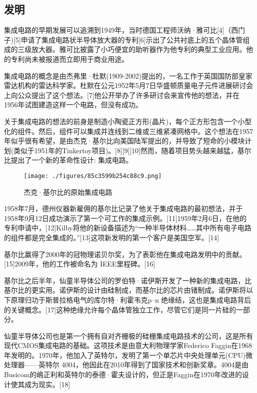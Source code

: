 \subsection{发明}

集成电路的早期发展可以追溯到1949年，当时德国工程师沃纳·雅可比[4]（西门子)[5]申请了集成电路状半导体放大器的专利[6]示出了公共衬底上的五个晶体管组成的三级放大器。雅可比披露了小巧便宜的助听器作为他专利的典型工业应用。他的专利尚未被报道而立即用于商业用途。

集成电路的概念是由杰弗里·杜默(1909-2002)提出的，一名工作于英国国防部皇家雷达机构的雷达科学家。杜默在公元1952年5月7日华盛顿质量电子元件进展研讨会上向公众提出了这个想法。[7]他公开举办了许多研讨会来宣传他的想法，并在1956年试图建造这样一个电路，但没有成功。

关于集成电路的想法的前身是制造小陶瓷正方形(晶片)，每个正方形包含一个小型化的组件。然后，组件可以集成并连线到二维或三维紧凑网格中。这个想法在1957年似乎很有希望，是由杰克·基尔比向美国陆军提出的，并导致了短命的小模块计划(类似于1951年的Tinkertoy项目)。[8][9][10]然而，随着项目势头越来越猛，基尔比提出了一个新的革命性设计: 集成电路。

\begin{figure}[ht]
\centering
\texttt{[image: ./figures/85c3599b254c88c9.png]}
\caption{杰克·基尔比的原始集成电路} \label{fig_icJCDL_2}
\end{figure}

1958年7月，德州仪器新雇佣的基尔比记录了他关于集成电路的最初想法，并于1958年9月12日成功演示了第一个可工作的集成示例。[11]1959年2月6日，在他的专利申请中，[12]Kilby将他的新设备描述为“一种半导体材料……其中所有电子电路的组件都是完全集成的。”[13]这项新发明的第一个客户是美国空军。[14]

基尔比赢得了2000年的冠物理诺贝尔奖，为了表彰他在集成电路发明中的贡献。[15]2009年，他的工作被命名为 IEEE里程碑。[16]

基尔比之后半年，仙童半导体公司的罗伯特·诺伊斯开发了一种新的集成电路，比基尔比的更实用。诺伊斯的设计由硅制成，而基尔比的芯片由锗制成。诺伊斯将以下原理归功于斯普拉格电气的库尔特·利霍韦克p–n 绝缘结，这也是集成电路背后的关键概念。[17]这种绝缘允许每个晶体管独立工作，尽管它们是同一片硅的一部分。

仙童半导体公司也是第一个拥有自对齐栅极的硅栅集成电路技术的公司，这是所有现代CMOS集成电路的基础。这项技术是由意大利物理学家Federico Faggin在1968年发明的。1970年，他加入了英特尔，发明了第一个单芯片中央处理单元(CPU)微处理器——英特尔 4004，他因此在2010年得到了国家技术和创新奖章。4004是由Busicom的嶋正利和英特尔的泰德·霍夫设计的，但正是Faggin在1970年改进的设计使其成为现实。[18]

